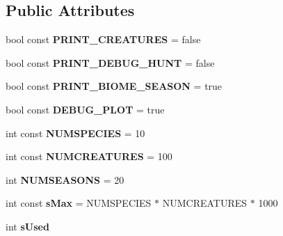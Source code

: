\subsection*{Public Attributes}
\begin{DoxyCompactItemize}
\item 
\mbox{\label{class_main_window_a5a579461e6d3da3db4a95a0c6b42c92b}} 
bool const {\bfseries P\+R\+I\+N\+T\+\_\+\+C\+R\+E\+A\+T\+U\+R\+ES} = false
\item 
\mbox{\label{class_main_window_a286ae12bebf668903a333f39d7223e16}} 
bool const {\bfseries P\+R\+I\+N\+T\+\_\+\+D\+E\+B\+U\+G\+\_\+\+H\+U\+NT} = false
\item 
\mbox{\label{class_main_window_a0a1ad208278e6125d212f806085ec54e}} 
bool const {\bfseries P\+R\+I\+N\+T\+\_\+\+B\+I\+O\+M\+E\+\_\+\+S\+E\+A\+S\+ON} = true
\item 
\mbox{\label{class_main_window_ac044a32e3f8d411066ef2369c47c8244}} 
bool const {\bfseries D\+E\+B\+U\+G\+\_\+\+P\+L\+OT} = true
\item 
\mbox{\label{class_main_window_ab77df82dcce9de9588e733190a6af1f6}} 
int const {\bfseries N\+U\+M\+S\+P\+E\+C\+I\+ES} = 10
\item 
\mbox{\label{class_main_window_a21dee883e6cfca8e664e361c46a10c6b}} 
int const {\bfseries N\+U\+M\+C\+R\+E\+A\+T\+U\+R\+ES} = 100
\item 
\mbox{\label{class_main_window_a91feb998b7e872bdd0eff4800ab30194}} 
int {\bfseries N\+U\+M\+S\+E\+A\+S\+O\+NS} = 20
\item 
\mbox{\label{class_main_window_ad8ce29de680719ac16dce2f4c8d07ab9}} 
int const {\bfseries s\+Max} = N\+U\+M\+S\+P\+E\+C\+I\+ES $\ast$ N\+U\+M\+C\+R\+E\+A\+T\+U\+R\+ES $\ast$ 1000
\item 
\mbox{\label{class_main_window_ae77061edba8dec4019f3fa23a79a591e}} 
int {\bfseries s\+Used}
\item 
\mbox{\label{class_main_window_ae42dace68680fa2b497199b30a2b198c}} 

\end{DoxyCompactItemize}
